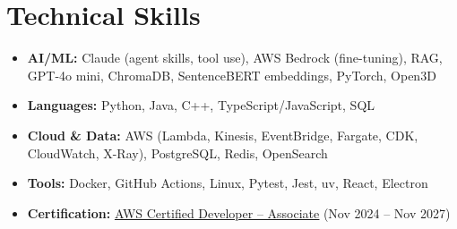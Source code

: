 \documentclass[letterpaper,10pt]{article}
\begin{document}
\section{Technical Skills}
\begin{itemize}[leftmargin=0in, label={}, itemsep=0pt, topsep=2pt]
  \small
  \item{\textbf{AI/ML:} Claude (agent skills, tool use), AWS Bedrock (fine-tuning), RAG, GPT-4o mini, ChromaDB, SentenceBERT embeddings, PyTorch, Open3D}
  \item{\textbf{Languages:} Python, Java, C++, TypeScript/JavaScript, SQL}
  \item{\textbf{Cloud \& Data:} AWS (Lambda, Kinesis, EventBridge, Fargate, CDK, CloudWatch, X-Ray), PostgreSQL, Redis, OpenSearch}
  \item{\textbf{Tools:} Docker, GitHub Actions, Linux, Pytest, Jest, uv, React, Electron}
  \item{\textbf{Certification:} \href{https://www.credly.com/badges/d2406a97-d937-47de-823b-724981159d3b/public_url}{\underline{AWS Certified Developer -- Associate}} (Nov 2024 -- Nov 2027)}
\end{itemize}
\end{document}
